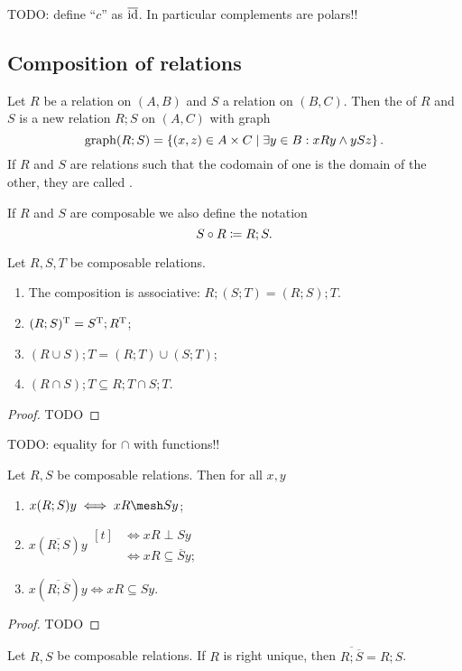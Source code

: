 TODO: define ``$c$'' as $\overline{\operatorname{id}}$. In particular complements are polars!!

\subsection{Composition of relations}
\begin{definition}
Let $R$ be a relation on $(A, B)$ and $S$ a relation on $(B, C)$. Then the  of $R$ and $S$ is a new relation $R;S$ on $(A, C)$ with graph
\[ \operatorname{graph}(R;S) = \left\{ (x,z)\in A\times C \;\middle|\; \exists y\in B: xRy \land ySz \right\}. \]
If $R$ and $S$ are relations such that the codomain of one is the domain of the other, they are called .

If $R$ and $S$ are composable we also define the notation
\[ S\circ R \coloneqq R;S. \]
\end{definition}
\begin{lemma} \label{relationalComposition}
Let $R,S,T$ be composable relations.
\begin{enumerate}
\item The composition is associative: $R;(S;T) = (R;S);T$.
\item $(R;S)^{\mathrm{T}} = S^{\mathrm{T}} ; R^{\mathrm{T}}$;
\item $(R\cup S);T = (R;T) \cup (S;T)$;
\item $(R\cap S);T \subseteq R;T \cap S;T$.
\end{enumerate}
\end{lemma}
\begin{proof}
TODO
\end{proof}
TODO: equality for $\cap$ with functions!!

\begin{lemma} \label{setOfRelationComposition}
Let $R,S$ be composable relations. Then for all $x,y$
\begin{enumerate}
\item $x(R;S)y \iff xR \mesh Sy$;
\item $x(\overline{R;S})y \begin{aligned}[t]
&\iff xR\perp Sy \\
&\iff xR \subseteq \overline{S}y;
\end{aligned}$
\item $x(\overline{R;\overline{S}})y \iff xR \subseteq Sy$.
\end{enumerate}
\end{lemma}
\begin{proof}
TODO
\end{proof}
\begin{corollary}
Let $R,S$ be composable relations. If $R$ is right unique, then $\overline{R;\overline{S}} = R;S$.
\end{corollary}


